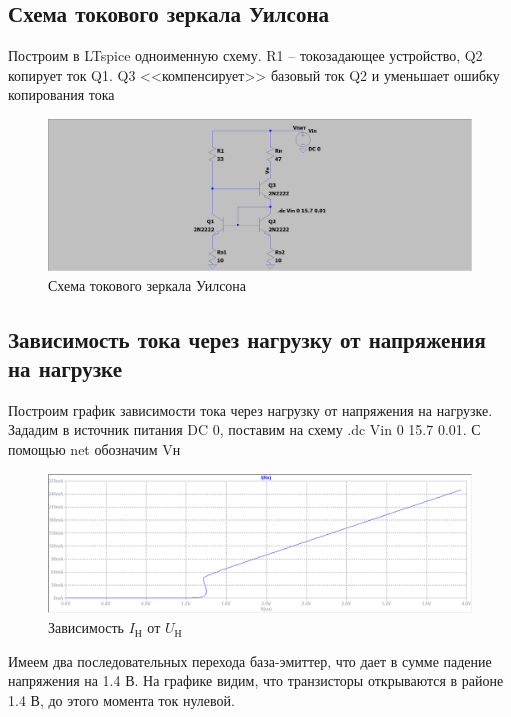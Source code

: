 \documentclass[a4paper, 12pt]{article}
\begin{document}
    \subsection{Схема токового зеркала Уилсона}
    Построим в LTspice одноименную схему. R1 -- токозадающее устройство,
    Q2 копирует ток Q1. Q3 <<компенсирует>> базовый ток Q2 и уменьшает ошибку копирования тока
    \begin{figure}[H]
        \centering
        \includegraphics[scale=0.22]{scheme2.png}
        \captionsetup{skip=0pt}
        \caption{Схема токового зеркала Уилсона}
        \label{fig:scheme2}
    \end{figure}


    \subsection{Зависимость тока через нагрузку от напряжения на нагрузке}
    Построим график зависимости тока через нагрузку от напряжения на нагрузке.
    Зададим в источник питания DC 0, поставим на схему .dc Vin 0 15.7 0.01.
    С помощью net обозначим Vн
    \begin{figure}[H]
        \centering
        \includegraphics[scale=0.46]{2task_Iн(Vн).png}
        \captionsetup{skip=0pt}
        \caption{Зависимость $I_\text{Н}$ от $U_\text{Н}$}
        \label{fig:2task_InVn}
    \end{figure}
    \noindent Имеем два последовательных перехода база-эмиттер, что дает в сумме падение напряжения на 1.4 В.
    На графике видим, что транзисторы открываются в районе 1.4 В, до этого момента ток нулевой.
\end{document}
